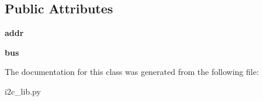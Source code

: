 \subsection*{Public Attributes}
\begin{DoxyCompactItemize}
\item 
\hypertarget{classdriver_1_1i2c__lib_1_1i2c__device_a9cfbff86867d526e3bcb5213d80b6f2c}{}{\bfseries addr}\label{classdriver_1_1i2c__lib_1_1i2c__device_a9cfbff86867d526e3bcb5213d80b6f2c}

\item 
\hypertarget{classdriver_1_1i2c__lib_1_1i2c__device_ac57614bbc2affcaf48f890e8a79c1e96}{}{\bfseries bus}\label{classdriver_1_1i2c__lib_1_1i2c__device_ac57614bbc2affcaf48f890e8a79c1e96}

\end{DoxyCompactItemize}


The documentation for this class was generated from the following file\+:\begin{DoxyCompactItemize}
\item 
i2c\+\_\+lib.\+py\end{DoxyCompactItemize}

